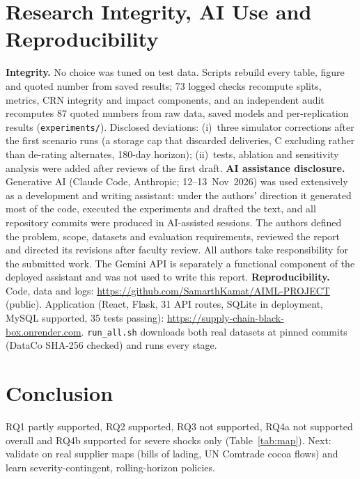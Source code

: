 \documentclass[conference]{IEEEtran}
\begin{document}
\section{Research Integrity, AI Use and Reproducibility}
\textbf{Integrity.} No choice was tuned on test data. Scripts rebuild every table, figure and quoted number from saved results;
73 logged checks recompute splits, metrics, CRN integrity and impact components, and an independent audit recomputes 87 quoted numbers from raw
data, saved models and per-replication results (\texttt{experiments/}). Disclosed deviations: (i)~three simulator corrections after the first scenario runs (a
storage cap that discarded deliveries, C excluding rather than de-rating alternates, 180-day horizon); (ii)~tests, ablation and sensitivity
analysis were added after reviews of the first draft.
\textbf{AI assistance disclosure.} Generative AI (Claude Code, Anthropic; 12--13~Nov~2026) was used extensively as a development and writing
assistant: under the authors' direction it generated most of the code, executed the experiments and drafted the text, and all repository
commits were produced in AI-assisted sessions. The authors defined the problem, scope, datasets and evaluation requirements, reviewed the
report and directed its revisions after faculty review. All authors take responsibility for the submitted work. The Gemini API is separately a
functional component of the deployed assistant and was not used to write this report.
\textbf{Reproducibility.} Code, data and logs: \url{https://github.com/SamarthKamat/AIML-PROJECT} (public). Application (React, Flask, 31 API
routes, SQLite in deployment, MySQL supported, 35 tests passing): \url{https://supply-chain-black-box.onrender.com}.
\texttt{run\_all.sh} downloads both real datasets at pinned commits (DataCo SHA-256 checked) and runs every stage.

\section{Conclusion}
RQ1 partly supported, RQ2 supported, RQ3 not supported, RQ4a not supported overall and RQ4b supported for severe shocks only
(Table~\ref{tab:map}). Next: validate on real supplier maps (bills of lading, UN Comtrade cocoa flows) and learn severity-contingent,
rolling-horizon policies.
\end{document}
